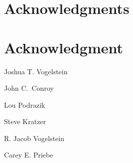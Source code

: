 \documentclass[10pt,journal,cspaper,compsoc]{IEEEtran}
\begin{document}
  \section*{Acknowledgments}
\else
  \section*{Acknowledgment}
\fi


\ifCLASSOPTIONcaptionsoff
  \newpage
\fi




\begin{IEEEbiographynophoto}{Joshua T. Vogelstein}

\end{IEEEbiographynophoto}



\begin{IEEEbiographynophoto}{John C.~Conroy}

\end{IEEEbiographynophoto}

\begin{IEEEbiographynophoto}{Lou Podrazik}

\end{IEEEbiographynophoto}

\begin{IEEEbiographynophoto}{Steve Kratzer}

\end{IEEEbiographynophoto}



\begin{IEEEbiographynophoto}{R. Jacob Vogelstein}
\end{IEEEbiographynophoto}

\begin{IEEEbiographynophoto}{Carey E. Priebe}
\end{IEEEbiographynophoto}

\end{document}
